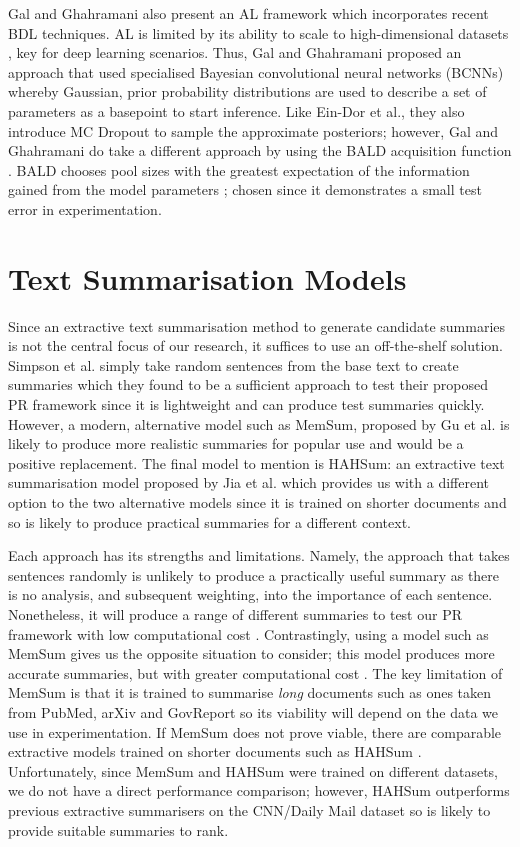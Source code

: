 \medbreak
Gal and Ghahramani \cite{Gal17} also present an AL framework which incorporates recent BDL techniques. AL is limited by its ability to scale to high-dimensional datasets \cite{Tong01}, key for deep learning scenarios. Thus, Gal and Ghahramani proposed an approach that used specialised Bayesian convolutional neural networks (BCNNs) whereby Gaussian, prior probability distributions are used to describe a set of parameters as a basepoint to start inference. Like Ein-Dor et al., they also introduce MC Dropout to sample the approximate posteriors; however, Gal and Ghahramani do take a different approach by using the BALD acquisition function \cite{Houlsby11}. BALD chooses pool sizes with the greatest expectation of the information gained from the model parameters \cite{Gal17}; chosen since it demonstrates a small test error in experimentation.

\section{Text Summarisation Models}
\label{chap:literaturereview:summodels}

Since an extractive text summarisation method to generate candidate summaries is not the central focus of our research, it suffices to use an off-the-shelf solution. Simpson et al. \cite{Simpson19} simply take random sentences from the base text to create summaries which they found to be a sufficient approach to test their proposed PR framework since it is lightweight and can produce test summaries quickly. However, a modern, alternative model such as MemSum, proposed by Gu et al. \cite{Gu22} is likely to produce more realistic summaries for popular use and would be a positive replacement. The final model to mention is HAHSum: an extractive text summarisation model proposed by Jia et al. \cite{Jia20} which provides us with a different option to the two alternative models since it is trained on shorter documents and so is likely to produce practical summaries for a different context.
		
\medbreak
Each approach has its strengths and limitations. Namely, the approach that takes sentences randomly is unlikely to produce a practically useful summary as there is no analysis, and subsequent weighting, into the importance of each sentence. Nonetheless, it will produce a range of different summaries to test our PR framework with low computational cost \cite{Simpson19}. Contrastingly, using a model such as MemSum gives us the opposite situation to consider; this model produces more accurate summaries, but with greater computational cost \cite{Gu22}. The key limitation of MemSum is that it is trained to summarise \emph{long} documents such as ones taken from PubMed, arXiv and GovReport so its viability will depend on the data we use in experimentation. If MemSum does not prove viable, there are comparable extractive models trained on shorter documents such as HAHSum \cite{Jia20}. Unfortunately, since MemSum and HAHSum were trained on different datasets, we do not have a direct performance comparison; however, HAHSum outperforms previous extractive summarisers on the CNN/Daily Mail dataset \cite{Nallapati16, Jia20} so is likely to provide suitable summaries to rank.